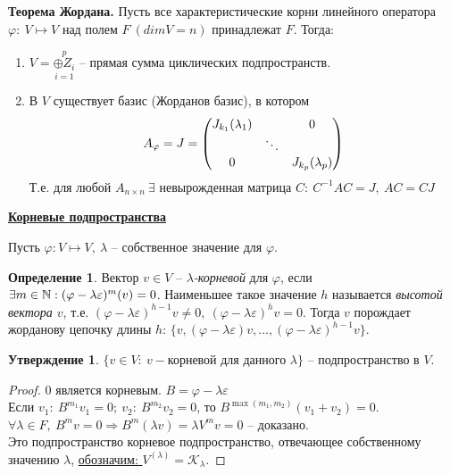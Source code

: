 \documentclass[a4paper, 12pt]{article}
\theoremstyle{definition}
\newtheorem*{definition}{Определение}
\newtheorem*{subtheorem}{Утверждение}
\begin{document}
    \textbf{Теорема Жордана.} Пусть все характеристические 
    корни линейного оператора $\varphi:\ V \longmapsto V$
    над полем $F\ (dimV = n)$ принадлежат $F$. Тогда:
    \begin{enumerate}
        \item $V = \overset{p}{\underset{i=1}{\oplus Z_i}}$
        -- прямая сумма циклических подпространств. 
        \item В $V$ существует базис (Жорданов базис), в котором
        $$A_\varphi = J = \begin{pmatrix}
            J_{k_1}(\lambda_1) & \null & 0\\
            \null & \ddots & \null\\
            0 & \null & J_{k_p}(\lambda_p)
        \end{pmatrix}$$ Т.е. для любой $A_{n\times n}\ 
        \exists$ невырожденная матрица $C:\ C^{-1}AC = J,\ 
        AC = CJ$
    \end{enumerate}
    \begin{center}
        \underline{\textbf{Корневые подпространства} } 
    \end{center}
    Пусть $\varphi: V \longmapsto V,\ \lambda$ --
    собственное значение для $\varphi$.
    \begin{definition}
        Вектор $v \in V$ -- \textit{$\lambda$-корневой} для $\varphi$,
        если $\exists m \in \mathbb{N}:\\ (\varphi - \lambda
        \varepsilon)^m(v) = 0$. Наименьшее такое значение 
        $h$ называется \textit{высотой вектора $v$}, т.е.
        $(\varphi - \lambda \varepsilon)^{h-1}v \neq 0,\ 
        (\varphi - \lambda \varepsilon)^hv = 0$. 
        Тогда $v$ порождает жорданову цепочку длины $h$:
        $\{v, (\varphi - \lambda \varepsilon)v,...,
        (\varphi - \lambda \varepsilon)^{h-1}v\}.$   
    \end{definition}
    \begin{subtheorem}
        $\{ v \in V:\ v - \text{корневой для данного } \lambda\}$ --
        подпространство в $V$. 
    \end{subtheorem}
    \begin{proof}
        $0$ является корневым. $B = \varphi - \lambda \varepsilon$\\
        Если $v_1:\ B^{m_1}v_1 = 0;\ v_2:\ B^{m_2}v_2 = 0$, то
        $B^{\max(m_1,m_2)}(v_1 + v_2) = 0$. 
        \\$\forall \lambda \in F,\ B^mv = 0 \Longrightarrow 
        B^m(\lambda v) = \lambda V^mv = 0$ -- доказано.\\
        Это подпространство корневое подпространство, 
        отвечающее собственному значению $\lambda$, 
        \underline{обозначим: $V^{(\lambda)} = \mathcal{K}_\lambda$}.
    \end{proof}
\end{document}
